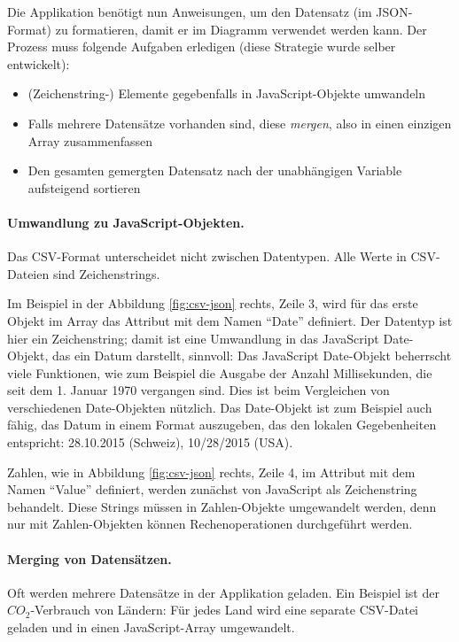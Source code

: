 Die Applikation benötigt nun Anweisungen, um den Datensatz (im JSON-Format) zu formatieren, damit er im Diagramm verwendet werden kann. Der Prozess muss folgende Aufgaben erledigen (diese Strategie wurde selber entwickelt):

\begin{itemize}
	\item (Zeichenstring-) Elemente gegebenfalls in JavaScript-Objekte umwandeln
	\item Falls mehrere Datensätze vorhanden sind, diese \textit{mergen}, also in einen einzigen Array zusammenfassen
	\item Den gesamten gemergten Datensatz nach der unabhängigen Variable aufsteigend sortieren
\end{itemize}

\paragraph{Umwandlung zu JavaScript-Objekten.} Das CSV-Format unterscheidet nicht zwischen Datentypen. Alle Werte in CSV-Dateien sind Zeichenstrings.

Im Beispiel in der Abbildung \ref{fig:csv-json} rechts, Zeile 3, wird für das erste Objekt im Array das Attribut mit dem Namen "`Date"' definiert. Der Datentyp ist hier ein Zeichenstring; damit ist eine Umwandlung in das JavaScript Date-Objekt, das ein Datum darstellt, sinnvoll: Das JavaScript Date-Objekt beherrscht viele Funktionen, wie zum Beispiel die Ausgabe der Anzahl Millisekunden, die seit dem 1. Januar 1970 vergangen sind. Dies ist beim Vergleichen von verschiedenen Date-Objekten nützlich. Das Date-Objekt ist zum Beispiel auch fähig, das Datum in einem Format auszugeben, das den lokalen Gegebenheiten entspricht: 28.10.2015 (Schweiz), 10/28/2015 (USA).

Zahlen, wie in Abbildung \ref{fig:csv-json} rechts, Zeile 4, im Attribut mit dem Namen "`Value"' definiert, werden zunächst von JavaScript als Zeichenstring behandelt. Diese Strings müssen in Zahlen-Objekte umgewandelt werden, denn nur mit Zahlen-Objekten können Rechenoperationen durchgeführt werden.

\paragraph{Merging von Datensätzen.} Oft werden mehrere Datensätze in der Applikation geladen. Ein Beispiel ist der $CO_2$-Verbrauch von Ländern: Für jedes Land wird eine separate CSV-Datei geladen und in einen JavaScript-Array umgewandelt.

